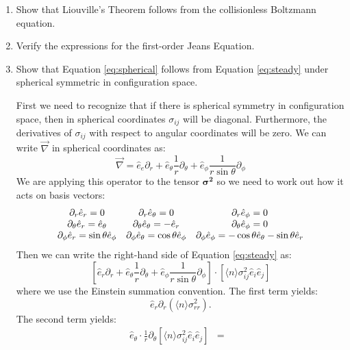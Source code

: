 \begin{enumerate}
\item Show that Liouville's Theorem follows from the collisionless
Boltzmann equation. 
\item Verify the expressions for the first-order Jeans Equation. 
\item Show that Equation \ref{eq:spherical} follows from
Equation \ref{eq:steady} under spherical symmetric in configuration
space. 
\begin{answer}
First we need to recognize that if there is spherical symmetry in
configuration space, then in spherical coordinates $\sigma_{ij}$ will
be diagonal. Furthermore, the derivatives of $\sigma_{ij}$ with
respect to angular coordinates will be zero. We can write
$\vec{\nabla}$ in spherical coordinates as:
\begin{equation}
\vec{\nabla} = {\hat e}_e \partial_r + {\hat
e}_\theta \frac{1}{r} \partial_\theta + {\hat
e}_\phi \frac{1}{r\sin\theta} \partial_\phi
\end{equation}
We are applying this operator to the tensor $\mathbf{\sigma^2}$ so we
need to work out how it acts on basis vectors:
\begin{equation}
\begin{array}{ccc}
\partial_r {\hat e}_r = 0 & 
\partial_r {\hat e}_\theta = 0 &
\partial_r {\hat e}_\phi = 0 \cr
\partial_\theta {\hat e}_r = {\hat e}_\theta & 
\partial_\theta {\hat e}_\theta = - {\hat e}_r &
\partial_\theta {\hat e}_\phi = 0 \cr
\partial_\phi {\hat e}_r = \sin\theta {\hat e}_\phi & 
\partial_\phi {\hat e}_\theta = \cos\theta {\hat e}_\phi &
\partial_\phi {\hat e}_\phi = - \cos\theta {\hat e}_\theta - \sin\theta {\hat e}_r \cr
\end{array}
\end{equation}
Then we can write the right-hand side of Equation \ref{eq:steady} as:
\begin{equation}
\left[{\hat e}_r \partial_r +
{\hat e}_\theta \frac{1}{r} \partial_\theta + 
{\hat e}_\phi \frac{1}{r\sin\theta} \partial_\phi\right] \cdot
\left[ \langle n\rangle \sigma_{ij}^2 {\hat e}_i {\hat e}_j \right]
\end{equation}
where we use the Einstein summation convention. The first term yields:
\begin{equation}
{\hat e}_r \partial_r \left(\langle n\rangle \sigma_{rr}^2\right).
\end{equation}
The second term yields:
\begin{eqnarray}
{\hat e}_\theta \cdot \frac{1}{r} \partial_\theta \left[ \langle
n\rangle \sigma_{ij}^2 {\hat e}_i {\hat e}_j \right] &=& 

\end{eqnarray}
\end{answer}
\end{enumerate}
